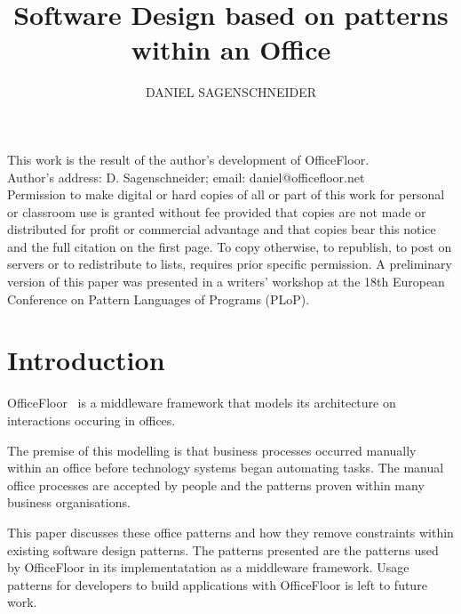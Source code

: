\documentclass[prodmode]{style/acmlarge}
\title{Software Design based on patterns within an Office}
\author{DANIEL SAGENSCHNEIDER \affil{OfficeFloor, daniel@officefloor.net}}
\begin{document}
\graphicspath{{./pdf/}}

\lstset{language=Java}

\captionsetup[lstlisting]{font=footnotesize}


\begin{bottomstuff}
This work is the result of the author's development of OfficeFloor.\\
Author's address: D. Sagenschneider; email: daniel@officefloor.net\\

Permission to make digital or hard copies of all or part of this work for
personal or classroom use is granted without fee provided that copies are not
made or distributed for profit or commercial advantage and that copies bear this
notice and the full citation on the first page. To copy otherwise, to republish,
to post on servers or to redistribute to lists, requires prior specific
permission. A preliminary version of this paper was presented in a writers'
workshop at the 18th European Conference on Pattern Languages of Programs
(PLoP).
\end{bottomstuff}

\maketitle



\section{Introduction}

OfficeFloor~\cite{officefloor} is a middleware framework that models its
architecture on interactions occuring in offices.

The premise of this modelling is that business processes occurred manually
within an office before technology systems began automating tasks.  The manual
office processes are accepted by people and the patterns proven within many
business organisations.

This paper discusses these office patterns and how they remove constraints
within existing software design patterns.  The patterns presented are the
patterns used by OfficeFloor in its implementatation as a middleware framework.
Usage patterns for developers to build applications with OfficeFloor is left to
future work.
\end{document}
